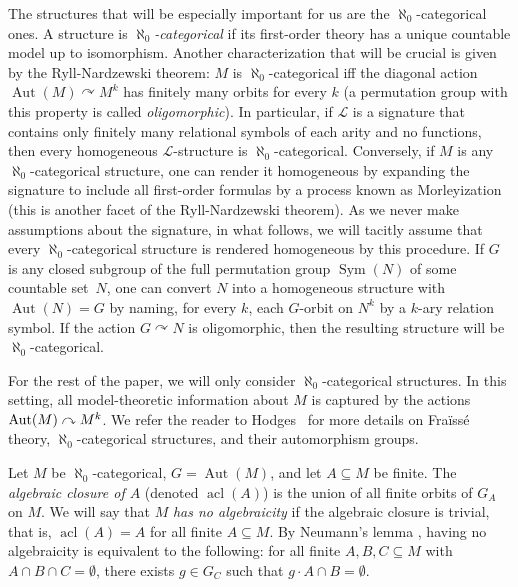\documentclass[11pt]{article}
\let\mathcal\mathscr
\let\actson\curvearrowright
\let\sub\subseteq
\theoremstyle{plain}
\theoremstyle{definition}
\newcommand{\cL}{\mathcal{L}}
\DeclareMathOperator{\acl}{acl}
\DeclareMathOperator{\Aut}{Aut}
\DeclareMathOperator{\Sym}{Sym}
\begin{document}
The structures that will be especially important for us are the $\aleph_0$-categorical ones. A structure is \emph{$\aleph_0$-categorical} if its first-order theory has a unique countable model up to isomorphism. Another characterization that will be crucial is given by the Ryll-Nardzewski theorem: $M$ is $\aleph_0$-categorical iff the diagonal action $\Aut(M) \actson M^k$ has finitely many orbits for every $k$ (a permutation group with this property is called \emph{oligomorphic}). In particular, if $\cL$ is a signature that contains only finitely many relational symbols of each arity and no functions, then every homogeneous $\cL$-structure is $\aleph_0$-categorical. Conversely, if $M$ is any $\aleph_0$-categorical structure, one can render it homogeneous by expanding the signature to include all first-order formulas by a process known as Morleyization (this is another facet of the Ryll-Nardzewski theorem). As we never make assumptions about the signature, in what follows, we will tacitly assume that every $\aleph_0$-categorical structure is rendered homogeneous by this procedure. If $G$ is any closed subgroup of the full permutation group $\Sym(N)$ of some countable set~$N$, one can convert $N$ into a homogeneous structure with $\Aut(N) = G$ by naming, for every $k$, each $G$-orbit on $N^k$ by a $k$-ary relation symbol. If the action $G \actson N$ is oligomorphic, then the resulting structure will be $\aleph_0$-categorical.

For the rest of the paper, we will only consider $\aleph_0$-categorical structures. In this setting, all model-theoretic information about $M$ is captured by the actions $\Aut(M) \actson\nobreak M^k$. We refer the reader to Hodges~\cite{Hodges1993} for more details on Fraïssé theory, $\aleph_0$-categorical structures, and their automorphism groups.

Let $M$ be $\aleph_0$-categorical, $G = \Aut(M)$, and let $A \sub M$ be finite. The \emph{algebraic closure of $A$} (denoted $\acl(A)$) is the union of all finite orbits of $G_A$ on $M$. We will say that $M$ \emph{has no algebraicity} if the algebraic closure is trivial, that is, $\acl(A) = A$ for all finite $A \sub M$. By Neumann's lemma \cite[Lem.\,4.2.1]{Hodges1993}, having no algebraicity is equivalent to the following: for all finite $A, B, C \sub M$ with $A \cap B \cap C = \emptyset$, there exists $g \in G_C$ such that $g \cdot A \cap B = \emptyset$.
\end{document}
